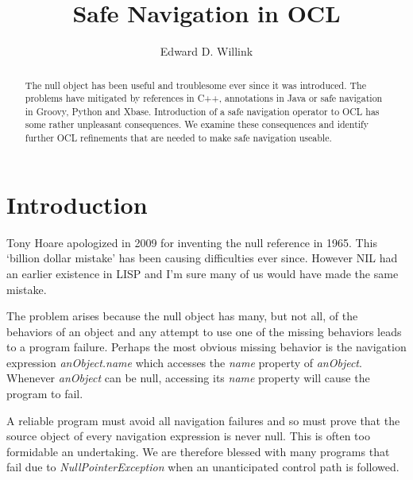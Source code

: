 \documentclass{llncs}
\begin{document}
%
\mainmatter              %
%
\title{Safe Navigation in OCL}
%
%
\author{Edward D. Willink}
%
%
%


\maketitle              %

\begin{abstract}
The null object has been useful and troublesome ever since it was introduced.
The problems have mitigated by references in C++, annotations in Java or safe navigation in Groovy, Python and Xbase.
Introduction of a safe navigation operator to OCL has some rather unpleasant consequences. We examine these
consequences and identify further OCL refinements that are needed to make safe navigation useable.

\end{abstract}
%
\section{Introduction}
%
Tony Hoare apologized in 2009\cite{Hoare-mistake} for inventing the null reference in 1965. This `billion dollar mistake' has been causing difficulties ever since. However NIL had an earlier existence in LISP and I'm sure many of us would have made the same mistake.

The problem arises because the null object has many, but not all, of the behaviors of an object and any attempt to use one of the missing behaviors leads to a program failure. Perhaps the most obvious missing behavior is the navigation expression \emph{anObject.name} which accesses the \emph{name} property of \emph{anObject}. Whenever \emph{anObject} can be null, accessing its \emph{name} property will cause the program to fail.

A reliable program must avoid all navigation failures and so must prove that the source object of every navigation expression is never null. This is often too formidable an undertaking. We are therefore blessed with many programs that fail due to \emph{NullPointerException} when an unanticipated control path is followed.
\end{document}
